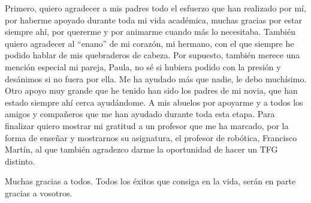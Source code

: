 \documentclass[twoside,a4paper,12pt,openany]{book}
\begin{document}
Primero, quiero agradecer a mis padres todo el esfuerzo que han realizado por mí, por haberme apoyado durante toda mi vida académica, muchas gracias por estar siempre ahí, por quererme y por animarme cuando más lo necesitaba.
También quiero agradecer al ``enano'' de mi corazón, mi hermano, con el que siempre he podido hablar de mis quebraderos de cabeza.
Por supuesto, también merece una mención especial mi pareja, Paula, no sé si hubiera podido con la presión y desánimos si no fuera por ella. Me ha ayudado más que nadie, le debo muchísimo.
Otro apoyo muy grande que he tenido han sido los padres de mi novia, que han estado siempre ahí cerca ayudándome.
A mis abuelos por apoyarme y a todos los amigos y compañeros que me han ayudado durante toda esta etapa.
Para finalizar quiero mostrar mi gratitud a un profesor que me ha marcado, por la forma de enseñar y mostrarnos su asignatura, el profesor de robótica, Francisco Martín, al que también agradezco darme la oportunidad de hacer un TFG distinto.

Muchas gracias a todos. Todos los éxitos que consiga en la vida, serán en parte gracias a vosotros.

\clearpage
\newpage{\pagestyle{empty}\cleardoublepage}

\newpage{\pagestyle{empty}\cleardoublepage} 
%


\frontmatter
\tableofcontents

\listoffigures

\mainmatter

\setcounter{page}{1}
















\end{document}
